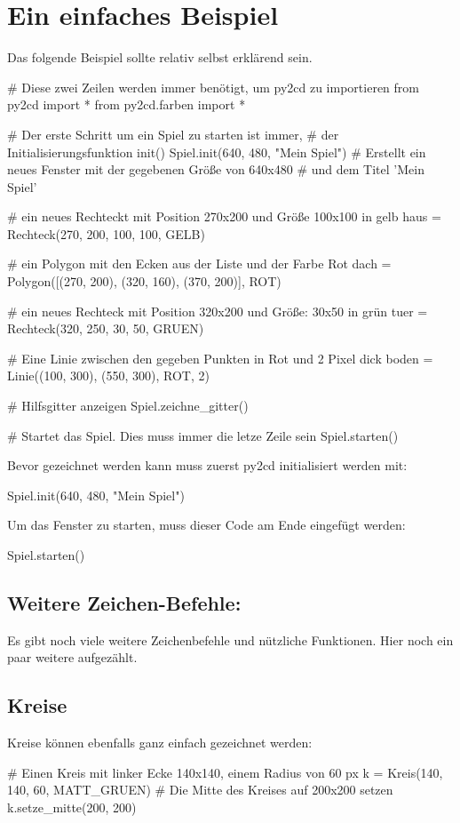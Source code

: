 \documentclass{\VorlagenPfad/coderdojokatext}
\begin{document}
\pagebreak
\section{Ein einfaches Beispiel}
Das folgende Beispiel sollte relativ selbst erklärend sein.
\begin{pythoncode}
# Diese zwei Zeilen werden immer benötigt, um py2cd zu importieren
from py2cd import *
from py2cd.farben import *

# Der erste Schritt um ein Spiel zu starten ist immer,
# der Initialisierungsfunktion init()
Spiel.init(640, 480, "Mein Spiel")
# Erstellt ein neues Fenster mit der gegebenen Größe von 640x480
# und dem Titel 'Mein Spiel'

# ein neues Rechteckt mit Position 270x200 und Größe 100x100 in gelb
haus = Rechteck(270, 200, 100, 100, GELB)

# ein Polygon mit den Ecken aus der Liste und der Farbe Rot
dach = Polygon([(270, 200), (320, 160), (370, 200)], ROT)

# ein neues Rechteck mit Position 320x200 und Größe: 30x50 in grün
tuer = Rechteck(320, 250, 30, 50, GRUEN)

# Eine Linie zwischen den gegeben Punkten in Rot und 2 Pixel dick
boden = Linie((100, 300), (550, 300), ROT, 2)

# Hilfsgitter anzeigen
Spiel.zeichne_gitter()

# Startet das Spiel. Dies muss immer die letze Zeile sein
Spiel.starten()
\end{pythoncode}

\begin{merkbox}
Bevor gezeichnet werden kann muss zuerst py2cd initialisiert werden mit:
\begin{pythoncode}
Spiel.init(640, 480, "Mein Spiel")
\end{pythoncode}
Um das Fenster zu starten, muss dieser Code am Ende eingefügt werden:
\begin{pythoncode}
Spiel.starten()
\end{pythoncode}
\end{merkbox}
\subsection{Weitere Zeichen-Befehle:}
Es gibt noch viele weitere Zeichenbefehle und nützliche Funktionen. Hier noch ein paar weitere aufgezählt.
\subsection{Kreise}
Kreise können ebenfalls ganz einfach gezeichnet werden:
\begin{pythoncode}
# Einen Kreis mit linker Ecke 140x140, einem Radius von 60 px
k = Kreis(140, 140, 60, MATT_GRUEN)
# Die Mitte des Kreises auf 200x200 setzen
k.setze_mitte(200, 200)
\end{pythoncode}
\end{document}
